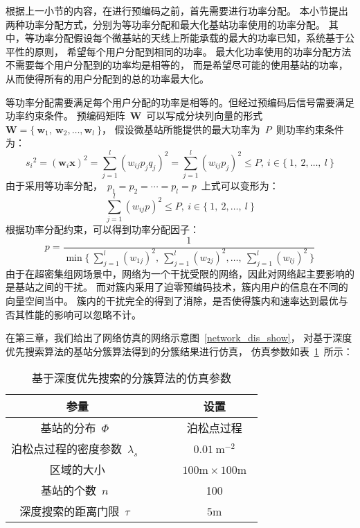 根据上一小节的内容，在进行预编码之前，首先需要进行功率分配。
本小节提出两种功率分配方式，分别为等功率分配和最大化基站功率使用的功率分配。
其中，等功率分配假设每个微基站的天线上所能承载的最大的功率已知，系统基于公平性的原则，
希望每个用户分配到相同的功率。
最大化功率使用的功率分配方法不需要每个用户分配到的功率均是相等的，
而是希望尽可能的使用基站的功率，从而使得所有的用户分配到的总的功率最大化。

等功率分配需要满足每个用户分配的功率是相等的。但经过预编码后信号需要满足功率约束条件。
预编码矩阵~$\mathbf{W}$~可以写成分块列向量的形式
~$\mathbf{W}=\{~\mathbf{w}_1,~\mathbf{w}_2,\dots,\mathbf{w}_l~\}$，
假设微基站所能提供的最大功率为~$P$~则功率约束条件为：
\begin{equation}\label{P_constrain}
  {s_i}^2 = (\mathbf{w}_i \mathbf{x})^2 = \sum_{j=1}^l (w_{ij} p_j q_j)^2
  = \sum_{j=1}^l (w_{ij} p_j)^2 \leq P ,~ i\in \{~1,~2, \dots, ~l~\}
\end{equation}
由于采用等功率分配，~$p_1=p_2=\cdots=p_l=p$~上式可以变形为：
\begin{equation}
  \sum_{j=1}^{l} (w_{ij}p)^2 \le P ,~ i\in \{~1,~2, \dots, ~l~\}
\end{equation}
根据功率分配约束，可以得到功率分配因子：
\begin{equation}
  p=\frac{1}{\min\{~\sum_{j=1}^{l} (w_{1j})^2,~\sum_{j=1}^{l} (w_{2j})^2,\dots,~\sum_{j=1}^{l} (w_{lj})^2~\}}
\end{equation}
由于在超密集组网场景中，网络为一个干扰受限的网络，因此对网络起主要影响的是基站之间的干扰。
而对簇内采用了迫零预编码技术，簇内用户的信息在不同的向量空间当中。
簇内的干扰完全的得到了消除，是否使得簇内和速率达到最优与否其性能的影响可以忽略不计。


在第三章，我们给出了网络仿真的网络示意图~\ref{network_dis_show}，
对基于深度优先搜索算法的基站分簇算法得到的分簇结果进行仿真，
仿真参数如表~\ref{dfs_show_sim_para}~所示：
\begin{table}[htbp]
\caption{基于深度优先搜索的分簇算法的仿真参数}
\label{dfs_show_sim_para}
\vspace{0.5em}\centering\wuhao
\begin{tabular}{cccc}
\toprule[1.5pt]
参量 & & & 设置 \\
\midrule[0.5pt]
基站的分布~$\Phi$~ & & & 泊松点过程 \\
泊松点过程的密度参数~$\lambda_s$~ & & & ~$0.01~\mathrm{m}^{-2}$~ \\
区域的大小  & & & ~$100\mathrm{m} \times 100 \mathrm{m}$~ \\
基站的个数~$n$~  & & & 100\\
深度搜索的距离门限~$\tau$~ & & & ~$5\mathrm{m}$~\\
\bottomrule[1.5pt]
\end{tabular}
\end{table}

